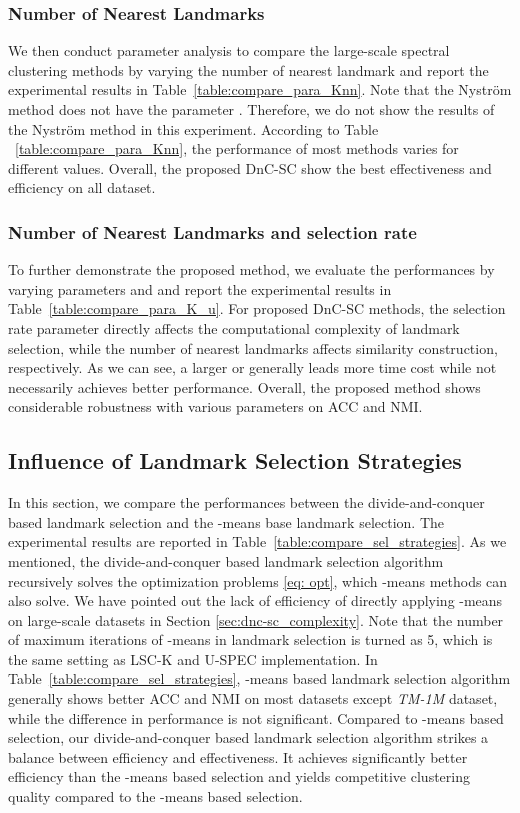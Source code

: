 \documentclass[a4paper,fleqn]{cas-dc}
\begin{document}
\subsubsection{Number of Nearest Landmarks }
\label{sec:para_K}

We then conduct parameter analysis to compare the large-scale spectral clustering methods by varying the number of nearest landmark  and report the experimental results in Table~\ref{table:compare_para_Knn}. 
Note that the Nystr{\"{o}}m method does not have the parameter .
Therefore, we do not show the results of the Nystr{\"{o}}m method in this experiment.
According to Table ~\ref{table:compare_para_Knn}, the performance of most methods varies for different  values.
Overall, the proposed DnC-SC show the best effectiveness and efficiency on all dataset. 

\subsubsection{Number of Nearest Landmarks  and selection rate }
\label{sec:para_K_u}

To further demonstrate the proposed method, we evaluate the performances by varying parameters  and  and report the experimental results in Table~\ref{table:compare_para_K_u}.
For proposed DnC-SC methods, the selection rate parameter  directly affects the computational complexity of landmark selection, while the number of nearest landmarks  affects similarity construction, respectively. 
As we can see, a larger  or  generally leads more time cost while not necessarily achieves better performance.
Overall, the proposed method shows considerable robustness with various parameters on ACC and NMI.

\subsection{Influence of Landmark Selection Strategies}
\label{sec:cmpSelStrat}

In this section, we compare the performances between the divide-and-conquer based landmark selection and the -means base landmark selection. The experimental results are reported in Table~\ref{table:compare_sel_strategies}.
As we mentioned, the divide-and-conquer based landmark selection algorithm recursively solves the optimization problems \ref{eq: opt}, which -means methods can also solve.
We have pointed out the lack of efficiency of directly applying -means on large-scale datasets in Section \ref{sec:dnc-sc_complexity}.
Note that the number of maximum iterations of -means in landmark selection is turned as 5, which is the same setting as LSC-K and U-SPEC implementation.
In Table~\ref{table:compare_sel_strategies}, -means based landmark selection algorithm generally shows better ACC and NMI on most datasets except \emph{TM-1M} dataset, while the difference in performance is not significant.
Compared to -means based selection, our divide-and-conquer based landmark selection algorithm strikes a balance between efficiency and effectiveness.
It achieves significantly better efficiency than the -means based selection and yields competitive clustering quality compared to the -means based selection.
\end{document}
